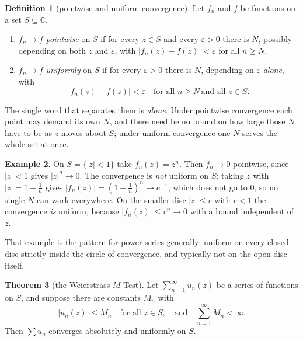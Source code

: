 \documentclass[11pt,a4paper]{article}
\theoremstyle{definition}
\newtheorem{thm}{Theorem}[section]
\newtheorem{definition}[thm]{Definition}
\newtheorem{example}[thm]{Example}
\begin{document}
\begin{definition}[pointwise and uniform convergence]
Let $f_n$ and $f$ be functions on a set $S \subseteq \mathbb{C}$.
\begin{enumerate}
\item[(i).] $f_n \rightarrow f$ \emph{pointwise} on $S$ if for every $z \in S$
and every $\varepsilon > 0$ there is $N$, possibly depending on both $z$ and
$\varepsilon$, with $\left|f_n(z) - f(z)\right| < \varepsilon$ for all $n \geq N$.
\item[(ii).] $f_n \rightarrow f$ \emph{uniformly} on $S$ if for every
$\varepsilon > 0$ there is $N$, depending on $\varepsilon$ \emph{alone}, with
$$\left|f_n(z) - f(z)\right| < \varepsilon \quad \text{for all } n \geq N
\,\text{and all } z \in S .$$
\end{enumerate}

The single word that separates them is \emph{alone}. Under pointwise convergence
each point may demand its own $N$, and there need be no bound on how large those
$N$ have to be as $z$ moves about $S$; under uniform convergence one $N$ serves
the whole set at once.
\end{definition}

\begin{example}
On $S = \{\left|z\right| < 1\}$ take $f_n(z) = z^n$. Then $f_n \rightarrow 0$
pointwise, since $\left|z\right| < 1$ gives $\left|z\right|^n \rightarrow 0$. The
convergence is \emph{not} uniform on $S$: taking $z$ with
$\left|z\right| = 1 - \tfrac{1}{n}$ gives
$\left|f_n(z)\right| = \left(1 - \tfrac{1}{n}\right)^n \rightarrow e^{-1}$,
which does not go to $0$, so no single $N$ can work everywhere. On the smaller
disc $\left|z\right| \leq r$ with $r < 1$ the convergence \emph{is} uniform,
because $\left|f_n(z)\right| \leq r^n \rightarrow 0$ with a bound independent of
$z$.

That example is the pattern for power series generally: uniform on every closed
disc strictly inside the circle of convergence, and typically not on the open
disc itself.
\end{example}

\begin{thm}[the Weierstrass $M$-Test]
Let $\displaystyle\sum^{\infty}_{n = 1} u_n(z)$ be a series of functions on
$S$, and suppose there are constants $M_n$ with
$$\left|u_n(z)\right| \leq M_n \quad \text{for all } z \in S,
\quad \text{and}\quad 
\sum^{\infty}_{n=1} M_n < \infty .$$
Then $\displaystyle\sum u_n$ converges absolutely and uniformly on $S$.
\end{thm}
\end{document}
